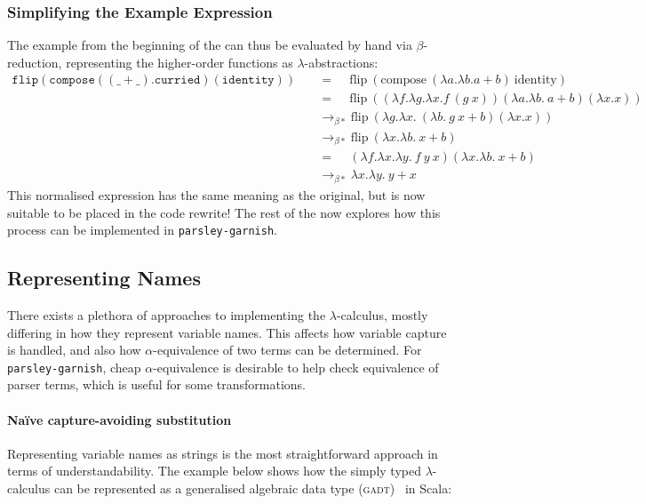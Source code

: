 \documentclass[../../../main.tex]{subfiles}
\begin{document}
\subsubsection{Simplifying the Example Expression}
The example from the beginning of the  can thus be evaluated by hand via $\beta$-reduction, representing the higher-order functions as $\lambda$-abstractions:
\begin{align*}
\mathtt{flip(compose((\_ + \_).curried)(identity))}\quad &\mathrel{=\quad\,} \mathrm{flip}\ (\mathrm{compose}\ (\lambda a. \lambda b. a + b)\ \mathrm{identity}) \\
&\mathrel{=\quad\,} \mathrm{flip}\ ( (\lambda f. \lambda g. \lambda x. f\ (g\ x)) (\lambda a. \lambda b.\ a + b) (\lambda x. x)) \\
&\rightarrow_{\beta*} \mathrm{flip}\ (\lambda g. \lambda x.\ (\lambda b.\ g\ x + b) (\lambda x. x)) \\
&\rightarrow_{\beta*} \mathrm{flip}\ (\lambda x. \lambda b.\ x + b) \\
&\mathrel{=\quad\,} (\lambda f. \lambda x. \lambda y.\ f\ y\ x) (\lambda x. \lambda b.\ x + b) \\
&\rightarrow_{\beta*} \lambda x. \lambda y.\ y + x
\end{align*}
%
This normalised expression has the same meaning as the original, but is now suitable to be placed in the code rewrite!
The rest of the  now explores how this process can be implemented in \texttt{parsley-garnish}.

\subsection{Representing Names}
There exists a plethora of approaches to implementing the $\lambda$-calculus, mostly differing in how they represent variable names.
This affects how variable capture is handled, and also how $\alpha$-equivalence of two terms can be determined.
For \texttt{parsley-garnish}, cheap $\alpha$-equivalence is desirable to help check equivalence of parser terms, which is useful for some transformations.

\paragraph{Naïve capture-avoiding substitution}
Representing variable names as strings is the most straightforward approach in terms of understandability.
The example below shows how the simply typed $\lambda$-calculus can be represented as a generalised algebraic data type (\textsc{gadt})~\cite{cheney_gadt_2003} in Scala:
\end{document}

